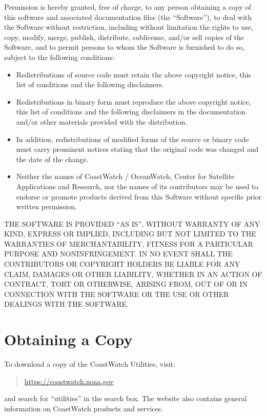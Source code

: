 Permission is hereby granted, free of charge, to any person obtaining
a copy of this software and associated documentation files (the ``Software''),
to deal with the Software without restriction, including without limitation
the rights to use, copy, modify, merge, publish, distribute, sublicense,
and/or sell copies of the Software, and to permit persons to whom the
Software is furnished to do so, subject to the following conditions:
\begin{itemize}

  \item Redistributions of source code must retain the above copyright notice,
  this list of conditions and the following disclaimers.

  \item Redistributions in binary form must reproduce the above copyright notice,
  this list of conditions and the following disclaimers in the documentation
  and/or other materials provided with the distribution.

  \item In addition, redistributions of modified forms of the source or binary
  code must carry prominent notices stating that the original code was
  changed and the date of the change.

  \item Neither the names of CoastWatch / OceanWatch, Center for Satellite
  Applications and Research, nor the names of its contributors may be used
  to endorse or promote products derived from this Software without specific
  prior written permission.

\end{itemize}
THE SOFTWARE IS PROVIDED ``AS IS'', WITHOUT WARRANTY OF ANY KIND, EXPRESS OR
IMPLIED, INCLUDING BUT NOT LIMITED TO THE WARRANTIES OF MERCHANTABILITY,
FITNESS FOR A PARTICULAR PURPOSE AND NONINFRINGEMENT. IN NO EVENT SHALL
THE CONTRIBUTORS OR COPYRIGHT HOLDERS BE LIABLE FOR ANY CLAIM, DAMAGES OR
OTHER LIABILITY, WHETHER IN AN ACTION OF CONTRACT, TORT OR OTHERWISE,
ARISING FROM, OUT OF OR IN CONNECTION WITH THE SOFTWARE OR THE USE OR OTHER
DEALINGS WITH THE SOFTWARE.

\section*{Obtaining a Copy}

To download a copy of the CoastWatch Utilities, visit:
\begin{quote}
  \url{https://coastwatch.noaa.gov}
\end{quote}
and search for ``utilities'' in the search box.  The website also 
contains general information on CoastWatch products and services.

